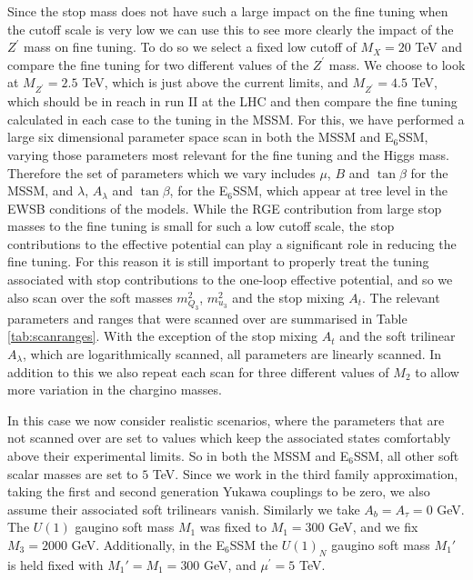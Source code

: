 \documentclass[preprint,amsmath,amssymb,aps,superscriptaddress,prd,showpacs,floatfix,nofootinbib]{revtex4-1}
\begin{document}
Since the stop mass does not have such a large impact on the fine
tuning when the cutoff scale is very low we can use this to see more
clearly the impact of the $Z^\prime$ mass on fine tuning. To do so we
select a fixed low cutoff of $M_X=20$ TeV and compare the fine tuning
for two different values of the $Z^\prime$ mass. We choose to look at
$M_{Z^\prime}=2.5$ TeV, which is just above the current limits, and
$M_{Z^\prime}=4.5$ TeV, which should be in reach in run II at the LHC
\cite{Godfrey:2013eta} and then compare the fine tuning calculated in
each case to the tuning in the MSSM.  For this, we have performed a
large six dimensional parameter space scan in both the MSSM and
E$_6$SSM, varying those parameters most relevant for the fine tuning
and the Higgs mass.  Therefore the set of parameters which we vary
includes $\mu$, $B$ and $\tan \beta$ for the MSSM, and $\lambda$,
$A_\lambda$ and $\tan \beta$, for the E$_6$SSM, which appear at tree
level in the EWSB conditions of the models. While the RGE contribution
from large stop masses to the fine tuning is small for such a low
cutoff scale, the stop contributions to the effective potential can
play a significant role in reducing the fine tuning.  For this reason it is still important to properly treat the
tuning associated with stop contributions to the one-loop effective
potential, and so we also scan over the soft masses $m_{Q_3}^2$,
$m_{u_3}^2$ and the stop mixing $A_t$.  The relevant parameters and
ranges that were scanned over are summarised in Table
\ref{tab:scanranges}. With the exception of the stop mixing $A_t$ and
the soft trilinear $A_\lambda$, which are logarithmically scanned, all
parameters are linearly scanned.  In addition to this we also repeat
each scan for three different values of $M_2$ to allow more variation
in the chargino masses.

 In this case we now consider realistic scenarios, where the
 parameters that are not scanned over are set to values which keep the
 associated states comfortably above their experimental limits.  So in
 both the MSSM and E$_6$SSM, all other soft scalar masses are set
 to $5$ TeV.  Since we work in the third family approximation, taking
 the first and second generation Yukawa couplings to be zero, we also
 assume their associated soft trilinears vanish. Similarly we take
$A_b=A_\tau=0$ GeV. The $U(1)$ gaugino soft mass $M_1$ was fixed to
 $M_1=300$ GeV, and we fix $M_3=2000$ GeV. Additionally, in the
 E$_6$SSM the $U(1)_N$ gaugino soft mass $M_1'$ is held fixed with
 $M_1'=M_1=300$ GeV, and $\mu^\prime=5$ TeV.  
\end{document}
